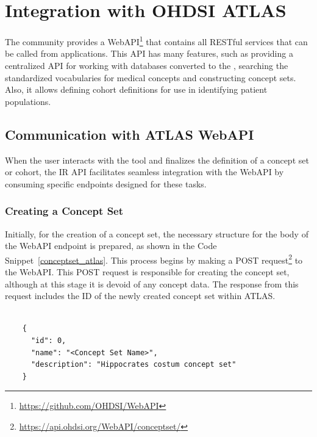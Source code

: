 \section{Integration with OHDSI ATLAS}

The {\ohdsi} community provides a WebAPI\footnote{\url{https://github.com/OHDSI/WebAPI}} that contains all {\ohdsi} RESTful services that can be called from {\ohdsi} applications. This API has many features, such as providing a centralized API for working with databases converted to the {\omop}, searching the {\omop} standardized vocabularies for medical concepts and constructing concept sets. Also, it allows defining cohort definitions for use in identifying patient populations.


\subsection{Communication with ATLAS WebAPI}

When the user interacts with the tool and finalizes the definition of a concept set or cohort, the IR API facilitates seamless integration with the {\ohdsi} WebAPI by consuming specific endpoints designed for these tasks.

\subsubsection{Creating a Concept Set}

Initially, for the creation of a concept set, the necessary structure for the body of the {\ohdsi} WebAPI endpoint is prepared, as shown in the Code Snippet~\ref{conceptset_atlas}. This process begins by making a POST request\footnote{\url{https://api.ohdsi.org/WebAPI/conceptset/}} to the {\ohdsi} WebAPI. This POST request is responsible for creating the concept set, although at this stage it is devoid of any concept data. The response from this request includes the ID of the newly created concept set within ATLAS.

\begin{listing}[H]
  \begin{verbatim}
      
    { 
      "id": 0, 
      "name": "<Concept Set Name>", 
      "description": "Hippocrates costum concept set"
    }

  \end{verbatim}
  \caption[The body to create the Concept Set in ATLAS]{The body to create the Concept Set in ATLAS.}
  \label{conceptset_atlas}
\end{listing}


